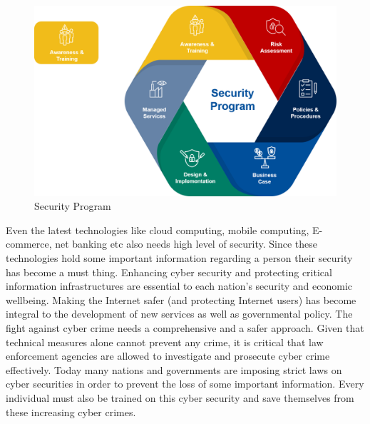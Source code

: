 \begin{figure}
    \centering
    \includegraphics[width=1\linewidth]{AT.png}
    \caption{Security Program}
    \label{fig:enter-label}
\end{figure}
\hspace*{0.3in}Even the latest technologies like cloud 
computing, mobile computing, E-commerce, net 
banking etc also needs high level of security. 
Since these technologies hold some important 
information regarding a person their security 
has become a must thing. Enhancing cyber
security and protecting critical information 
infrastructures are essential to each nation's 
security and economic wellbeing. Making the 
Internet safer (and protecting Internet users) has 
become integral to the development of new 
services as well as governmental policy. The 
fight against cyber crime needs a 
comprehensive and a safer approach. Given that 
technical measures alone cannot prevent any 
crime, it is critical that law enforcement 
agencies are allowed to investigate and 
prosecute cyber crime effectively. Today many 
nations and governments are imposing strict 
laws on cyber securities in order to prevent the 
loss of some important information. Every 
individual must also be trained on this cyber 
security and save themselves from these 
increasing cyber crimes. \\